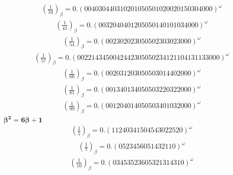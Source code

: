 \documentclass[fleqn]{article}
\begin{document}
\begin{equation*}
\begin{split}
(\frac{1}{34})_\beta = 0.(004030440310201050501020020150304000)^\omega
\end{split}\end{equation*}
\begin{equation*}
\begin{split}
(\frac{1}{41})_\beta = 0.(0032040401205050140101034000)^\omega
\end{split}\end{equation*}
\begin{equation*}
\begin{split}
(\frac{1}{54})_\beta = 0.(002302023050502303023000)^\omega
\end{split}\end{equation*}
\begin{equation*}
\begin{split}
(\frac{1}{57})_\beta = 0.(0022143450042442305050234121104131133000)^\omega
\end{split}\end{equation*}
\begin{equation*}
\begin{split}
(\frac{1}{66})_\beta = 0.(002031203050503014402000)^\omega
\end{split}\end{equation*}
\begin{equation*}
\begin{split}
(\frac{1}{81})_\beta = 0.(001340134050503220322000)^\omega
\end{split}\end{equation*}
\begin{equation*}
\begin{split}
(\frac{1}{99})_\beta = 0.(001204014050503401032000)^\omega
\end{split}\end{equation*}
$\boldsymbol{\beta^2 = 6\beta + 1}$
\begin{equation*}
\begin{split}
(\frac{1}{5})_\beta = 0.(11240341504543022520)^\omega
\end{split}\end{equation*}
\begin{equation*}
\begin{split}
(\frac{1}{7})_\beta = 0.(0523456051432110)^\omega
\end{split}\end{equation*}
\begin{equation*}
\begin{split}
(\frac{1}{10})_\beta = 0.(03453523605321314310)^\omega
\end{split}\end{equation*}
\end{document}
